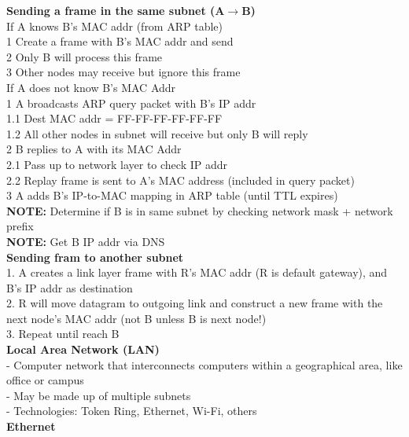 \documentclass[10pt, a4paper]{article}
\newcommand{\highlight}[1]{{\color{red}\textbf{#1}}}
\newcommand{\blue}[1]{{\color{MidnightBlue}#1}}
\newcommand{\red}[1]{{\color{red}#1}}
\newcommand{\tab}[0]{\hspace*{2mm}}
\begin{document}
\begin{multicols*}{3}
		\textbf{Sending a frame in the same subnet (A$\rightarrow$B)}\\
		If A knows B's MAC addr (from ARP table)\\
		\tab 1 Create a frame with B's MAC addr and send\\
		\tab 2 \red{Only B} will process this frame\\
		\tab 3 Other nodes may receive but ignore this frame\\
		If A does not know B's MAC Addr\\
		\tab 1 A \red{broadcasts ARP query packet} with B's \blue{IP addr}\\
		\tab\tab 1.1 Dest MAC addr = FF-FF-FF-FF-FF-FF\\
		\tab\tab 1.2 All other nodes in subnet will receive but only B will reply\\
		\tab 2 B replies to A with its MAC Addr\\
		\tab\tab 2.1 Pass up to network layer to check IP addr\\
		\tab\tab 2.2 Replay frame is sent to A's MAC address (included in query packet)\\
		\tab 3 A adds B's IP-to-MAC mapping in ARP table (until TTL expires)\\
		\highlight{NOTE:} Determine if B is in same subnet by checking network mask + network prefix\\
		\highlight{NOTE:} Get B IP addr via DNS\\

		\textbf{Sending fram to \red{another} subnet}\\
		1. A creates a link layer frame with \red{R's MAC addr} (R is default gateway), and \red{B's IP addr} as destination\\
		2. R will move datagram to outgoing link and construct a new frame with the \red{next node's MAC addr} (not B unless B is next node!)\\
		3. Repeat until reach B\\

		\textbf{Local Area Network (LAN)}\\
		- Computer network that interconnects computers within a geographical area, like office or campus\\
		- May be made up of multiple subnets\\
		- Technologies: Token Ring, Ethernet, Wi-Fi, others\\

		\textbf{Ethernet}\\


\end{multicols*}
\end{document}
